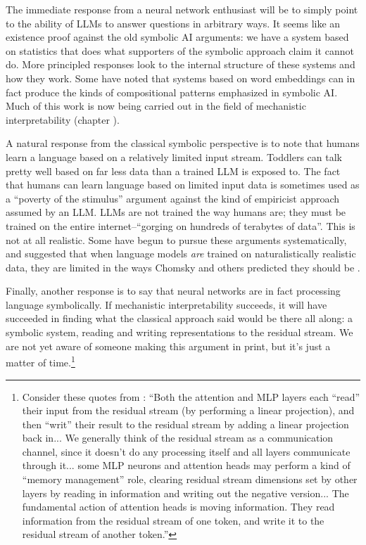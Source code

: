 The immediate response from a neural network enthusiast will be to simply point
to the ability of LLMs to answer questions in arbitrary ways. It seems like an
existence proof against the old symbolic AI arguments: we have a system based
on statistics that does what supporters of the symbolic approach claim it
cannot do. More principled responses look to the internal structure of these
systems and how they work. Some have noted that systems based on word
embeddings can in fact produce the kinds of compositional patterns emphasized
in symbolic AI. Much of this work is now being carried out in the field of
mechanistic interpretability (chapter ). 

A natural response from the classical symbolic perspective is to note that
humans learn a language based on a relatively limited input stream. Toddlers
can talk pretty well based on  far less data than a trained LLM is exposed to.
The fact that humans can learn language based on limited input data is
sometimes used as a ``poverty of the stimulus'' argument against the kind of
empiricist approach assumed by an LLM.  LLMs are not trained the way humans
are; they must be trained on the entire internet--``gorging on hundreds of
terabytes of data''.  This is not at all realistic. Some have begun to pursue
these arguments systematically, and suggested that when language models
\emph{are} trained on naturalistically realistic data, they are limited in the
ways Chomsky and others predicted they should be \cite{lan2024large}.

Finally, another response is to say that neural networks are in fact processing
language symbolically. If mechanistic interpretability succeeds, it will have
succeeded in finding what the classical approach said would be there all along:
a  symbolic system, reading and writing representations to the residual stream.
We are not yet aware of someone making this argument in print, but it's just a
matter of time.\footnote{Consider these quotes from
\cite{elhage2021mathematical}: ``Both the attention and MLP layers each
``read'' their input from the residual stream (by performing a linear
projection), and then ``writ'' their result to the residual stream by adding a
linear projection back in... We generally think of the residual stream as a
communication channel, since it doesn't do any processing itself and all layers
communicate through it... some MLP neurons and attention heads may perform a
kind of ``memory management'' role, clearing residual stream dimensions set by
other layers by reading in information and writing out the negative version...
The fundamental action of attention heads is moving information. They read
information from the residual stream of one token, and write it to the residual
stream of another token.''}

